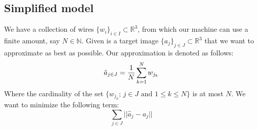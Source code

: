 \documentclass[10pt,a4paper]{article}
\newcommand{\R}{\mathbb{R}}
\newcommand{\N}{\mathbb{N}}
\begin{document}
	\subsection*{Simplified model}
	We have a collection of wires $\{w_i\}_{i \in I} \subset \R^3$, from which our machine can use a finite amount, say $N \in \N$.
	Given is a target image $\{a_j\}_{j \in J} \subset \R^3$ that we want to approximate as best as possible.
	Our approximation is denoted as follows:
	\begin{equation}
	\hat{a}_{j \in J} = {1 \over N} \sum_{k=1}^{N} w_{j_k} 
	\end{equation}
	Where the cardinality of the set $\{w_{j_k}; \, j\in J \text{ and } 1 \leq k \leq N \}$ is at most $N$.
	We want to minimize the following term:
	\begin{equation}
	\sum_{j\in J} || \hat{a}_j - a_j || 
	\end{equation}
	
\end{document}
